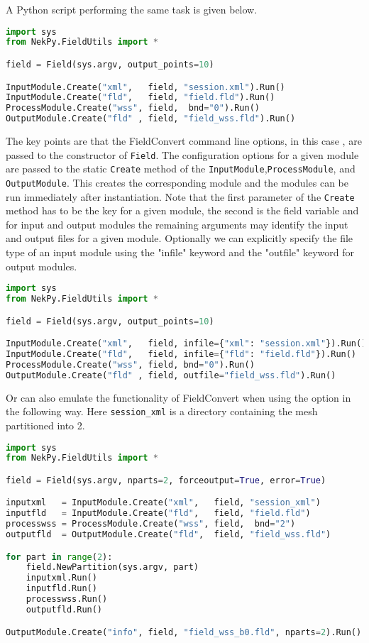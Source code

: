 A Python script performing the same task is given below.

\begin{lstlisting}[style=C++Style, language=Python]
import sys
from NekPy.FieldUtils import *

field = Field(sys.argv, output_points=10)

InputModule.Create("xml",   field, "session.xml").Run()
InputModule.Create("fld",   field, "field.fld").Run()
ProcessModule.Create("wss", field,  bnd="0").Run()
OutputModule.Create("fld" , field, "field_wss.fld").Run()
\end{lstlisting}

The key points are that the FieldConvert command line options, in this
case , are passed to the constructor of \verb+Field+.
The configuration options for a given module are passed to the static
\verb+Create+ method of the \verb+InputModule+,\verb+ProcessModule+, and
\verb+OutputModule+. This creates the corresponding module and the
modules can be run immediately after instantiation. Note that the first
parameter of the \verb+Create+ method has to be the key for a given module,
the second is the field variable and for input and output modules the remaining
arguments may identify the input and output files for a given module.
Optionally we can explicitly specify the file type of an input module
using the "infile" keyword and the "outfile" keyword for output modules.


\begin{lstlisting}[style=C++Style, language=Python]
import sys
from NekPy.FieldUtils import *

field = Field(sys.argv, output_points=10)

InputModule.Create("xml",   field, infile={"xml": "session.xml"}).Run()
InputModule.Create("fld",   field, infile={"fld": "field.fld"}).Run()
ProcessModule.Create("wss", field, bnd="0").Run()
OutputModule.Create("fld" , field, outfile="field_wss.fld").Run()
\end{lstlisting}

Or can also emulate the functionality of FieldConvert when using the
 option in the following way. Here \verb+session_xml+ is a
directory containing the mesh partitioned into 2.

\begin{lstlisting}[style=C++Style, language=Python]
import sys
from NekPy.FieldUtils import *

field = Field(sys.argv, nparts=2, forceoutput=True, error=True)

inputxml   = InputModule.Create("xml",   field, "session_xml")
inputfld   = InputModule.Create("fld",   field, "field.fld")
processwss = ProcessModule.Create("wss", field,  bnd="2")
outputfld  = OutputModule.Create("fld",  field, "field_wss.fld")

for part in range(2):
	field.NewPartition(sys.argv, part)
	inputxml.Run()
	inputfld.Run()
	processwss.Run()
	outputfld.Run()

OutputModule.Create("info", field, "field_wss_b0.fld", nparts=2).Run()
\end{lstlisting}

